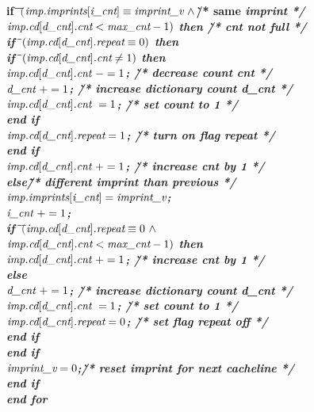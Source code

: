 \begin{algorithm}[t]
{\begin{tabbing}
\>\>\bf{if}\=\ $($\=$\it{imp.imprints}[\it{i\_cnt}] \equiv \it{imprint\_v}\ \wedge$\` /* same \it{imprint} */\\
\>\>\>\>$\it{imp.cd}[\it{d\_cnt}]\it{.cnt} < \it{max\_cnt}-1)$ \bf{then}
\` /* \it{cnt} not full */\\
\>\>\>\bf{if}\=\ $(\it{imp.cd}[\it{d\_cnt}]\it{.repeat}\equiv 0)$ \bf{then}\\
\>\>\>\>\bf{if}\=\ $(\it{imp.cd}[\it{d\_cnt}]\it{.cnt}\not = 1)$ \bf{then}\\
\>\>\>\>\>$\it{imp.cd}[\it{d\_cnt}]\it{.cnt}\ -= 1$;
\` /* decrease count \it{cnt} */\\
\>\>\>\>\>$\it{d\_cnt}\ += 1$;
\` /* increase dictionary count \it{d\_cnt} */\\
\>\>\>\>\>$\it{imp.cd}[\it{d\_cnt}]\it{.cnt}\ = 1$;
\` /* set count to 1 */\\
\>\>\>\>\bf{end if}\\
\>\>\>\>$\it{imp.cd}[\it{d\_cnt}]\it{.repeat} = 1$;
\` /* turn on flag \it{repeat} */\\
\>\>\>\bf{end if}\\
\>\>\>$\it{imp.cd}[\it{d\_cnt}]\it{.cnt}\ +=1$;
\` /* increase \it{cnt} by 1 */\\
\>\>\bf{else}\=\` /* different \it{imprint} than previous */\\
\>\>\>$\it{imp.imprints}[\it{i\_cnt}] = \it{imprint\_v}$;\\
\>\>\>$\it{i\_cnt}\ += 1$;\\
\>\>\>\bf{if}\=\ $($\=$\it{imp.cd}[\it{d\_cnt}]\it{.repeat}\equiv 0\ \wedge$\\
\>\>\>\>\>$\it{imp.cd}[\it{d\_cnt}]\it{.cnt}<\it{max\_cnt}-1)$
\bf{then}\\
\>\>\>\>$\it{imp.cd}[\it{d\_cnt}]\it{.cnt}\ +=1$;
\` /* increase \it{cnt} by 1 */\\
\>\>\>\bf{else}\\
\>\>\>\>$\it{d\_cnt}\ += 1$;
\` /* increase dictionary count \it{d\_cnt} */\\
\>\>\>\>$\it{imp.cd}[\it{d\_cnt}]\it{.cnt}\ = 1$;
\` /* set count to 1 */\\
\>\>\>\>$\it{imp.cd}[\it{d\_cnt}]\it{.repeat} = 0$;
\` /* set flag \it{repeat} off */\\
\>\>\>\bf{end if}\\
\>\>\bf{end if}\\
\>\>$\it{imprint\_v} = 0$;\` /* reset \it{imprint} for next cacheline */\\
\>\bf{end if}\\
\bf{end for}
\end{tabbing}
}%
\vspace{-10pt}
\end{algorithm}

